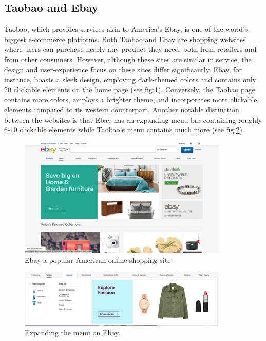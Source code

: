 \subsection{Taobao and Ebay}
Taobao, which provides services akin to America's Ebay, is one of the world's biggest e-commerce platforms. Both Taobao and Ebay are shopping websites where users can purchase nearly any product they need, both from retailers and from other consumers. However, although these sites are similar in service, the design and user-experience focus on these sites differ significantly. Ebay, for instance, boasts a sleek design, employing dark-themed colors and contains only 20 clickable elements on the home page (see fig:\ref{fig:ebay}). Conversely, the Taobao page contains more colors, employs a brighter theme, and incorporates more clickable elements compared to its western counterpart. Another notable distinction between the websites is that Ebay has an expanding menu bar containing roughly 6-10 clickable elements while Taobao's menu contains much more (see fig:\ref{fig:ebay_menu}).

\begin{figure}[h]
\centering
\includegraphics[width=100mm]{Images/ebay.png}
\decoRule
\caption[ebay]{Ebay a popular American online shopping site}
\label{fig:ebay}
\end{figure}

\begin{figure}[h]
\centering
\includegraphics[width=100mm]{Images/ebay_menu.png}
\decoRule
\caption[Ebay's menu bar]{Expanding the menu on Ebay.}
\label{fig:ebay_menu}
\end{figure}

